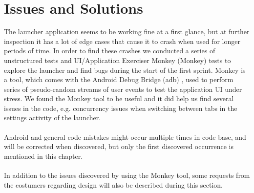 
\chapter{Issues and Solutions}

The launcher application seems to be working fine at a first glance, but at further inspection it has a lot of edge cases that cause it to crash when used for longer periods of time. In order to find these crashes we conducted a series of unstructured tests and UI/Application Exerciser Monkey (Monkey) \parencite{android_monkey} tests to explore the launcher and find bugs during the start of the first sprint. Monkey is a tool, which comes with the Android Debug Bridge (adb) \parencite{android_adb}, used to perform series of pseudo-random streams of user events to test the application UI under stress. We found the Monkey tool to be useful and it did help us find several issues in the code, e.g. concurrency issues when switching between tabs in the settings activity of the launcher.
\\\\
Android and general code mistakes might occur multiple times in code base, and will be corrected when discovered, but only the first discovered occurrence is mentioned in this chapter. 
\\\\
In addition to the issues discovered by using the Monkey tool, some requests from the costumers regarding design will also be described during this section.



















